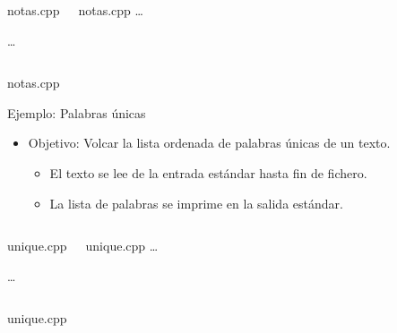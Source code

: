  {

\begin{frame}
\begin{columns}[T]
\begin{block}{notas.cpp}

\ldots
\end{block}

\begin{block}{notas.cpp}
\ldots

\end{block}
\end{columns}
\end{frame}

}

 {
\begin{frame}
\begin{block}{notas.cpp}

\end{block}
\end{frame}
}

\begin{frame}[t]{Ejemplo: Palabras únicas}
\begin{itemize}
  \item \alert{Objetivo}: Volcar la lista ordenada de palabras únicas de un texto.
    \begin{itemize}
      \item El texto se lee de la entrada estándar hasta fin de fichero.
      \item La lista de palabras se imprime en la salida estándar.
    \end{itemize}
\end{itemize}
\end{frame}


 {

\begin{frame}
\begin{columns}[T]

\begin{block}{unique.cpp}

\ldots
\end{block}

\begin{block}{unique.cpp}
\ldots

\end{block}
\end{columns}
\end{frame}

}

 {

\begin{frame}
\begin{block}{unique.cpp}

\end{block}
\end{frame}

}
